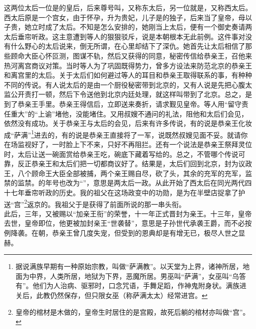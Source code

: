   这两位太后一位是的皇后，后来尊号叫，又称东太后，另一位就是，又称西太后。西太后原是一个宫女，由于怀孕，升为贵妃，儿子是的独子，后来当了皇帝，母以子贵，她立时成了太后。不知是怎么安排的，她刚当上太后，便有一个御史奏请两太后垂帘听政。这主意遭到等人的狠狠驳斥，说是本朝根本无此前例。这件事对没有什么野心的太后说来，倒无所谓，在心里却结下了深仇。她首先让太后相信了那些顾命大臣心怀叵测，图谋不轨，然后又获得的同意，秘密传信给恭亲王，召他来热河离宫商议对策。当时等人为了巩固既得势力，曾多方设法来防范北京的恭亲王和离宫里的太后。关于太后们如何避过等人的耳目和恭亲王取得联系的事，有种种不同的传说。有人说太后的是由一个厨役秘密带到北京的，又有人说是先把心腹太监公开责打一顿，然后下令送他到北京内廷处理，就这样叫带到了北京。总之，是到了恭亲王手里。恭亲王得信后，立即送来奏折，请求觐见皇帝。等人用“留守责任重大”的“上谕”堵他，没能堵住。又用叔嫂不通问的礼法，阻他和太后们会见，依然没有成功。关于恭亲王与太后的会见，后来有许多传说，有的说是恭亲王化妆成“萨满”\footnote{据说满族早期有一种原始宗教，叫做“萨满教”。以天堂为上界，诸神所居，地面为中界，人类所居，地狱为下界，恶魔所居。男巫叫“萨满”，女巫叫“乌答有”。他们为人治病、驱邪时，口念咒语，手舞足蹈，作神鬼附身状。满族进关后，此教仍然保存，但只限女巫（称萨满太太）经常进宫。}进去的，有的说是恭亲王直接将了一军，说既然叔嫂见面不妥。就请你在场监视好了，一时脸上下不来，只好不再阻拦。还有一个说法是恭亲王祭拜灵位时，太后让送一碗面赏给恭亲王吃，碗底下藏着写给的。总之，不管哪个传说可靠，反正恭亲王和太后们把一切都商议好了。结果是，太后们回到北京，封为议政王，八个顾命王大臣全部被捕，两个亲王赐自尽，砍了头，其余的充军的充军，监禁的监禁。的年号也改为“”，意思是两太后一政。从此开始了西太后在同光两代四十七年垂帘听政的历史。我的祖父在这场政变中的功勋，是为在半壁店捉拿了护送“宫”\footnote{皇帝的棺材是木做的，皇帝生时居住的是宫殿，故死后躺的棺材亦叫做“宫”。}返京的。我祖父于是获得了前面所说的那一串头衔。\\

  此后，三年，又被赐以“加亲王衔”的荣誉，十一年正式晋封为亲王。十三年，皇帝去世，皇帝即位，他更被加封亲王“世袭替”，意思是子孙世代承袭王爵，而不必按例降袭。在朝，恭亲王曾几度失宠，但受到的恩典却是有增无已，极尽人世之显赫。\\

